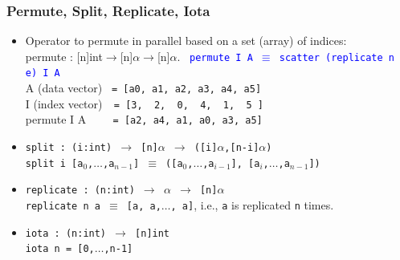 \documentclass{beamer}
\newcommand{\blue}[1]{\textcolor{Blue}{{#1}}}
\renewcommand{\emph}[1]{\textcolor{structure}{#1}}
\newcommand{\emp}[1]{\textcolor{DikuRed}{ #1}}
\begin{document}
\begin{frame}[fragile,t]
  \frametitle{Permute, Split, Replicate, Iota}

\begin{itemize}
    \item Operator to \emph{permute in parallel} based on a set (array) of indices:\\
          \emph{permute : [n]int$\rightarrow$[n]$\alpha$$\rightarrow$[n]$\alpha$}. 
          {\small~\blue{\tt permute~I~A~$\equiv$~scatter~(replicate n e)~I~A}}\\
           A (data vector) {\tt~= [a0,~a1,~a2,~a3,~a4,~a5]}\\
           I (index vector){\tt~~= [3,~~2,~~0,~~4,~~1,~~5~]}\\
           \emp{permute I A     {\tt~~~~= [a2,~a4,~a1,~a0,~a3,~a5]}}\\\bigskip
           
    \item %
          \emph{\tt split : (i:int) $\rightarrow$ [n]$\alpha$ $\rightarrow$ ([i]$\alpha$,[n-i]$\alpha$)}\\
          \emp{\tt split i [a$_0$,$\ldots$,a$_{n-1}$] $\equiv$ ([a$_0$,$\ldots$,a$_{i-1}$], [a$_i$,$\ldots$,a$_{n-1}$])}\smallskip

    \item \emph{\tt replicate : (n:int) $\rightarrow$ $\alpha$ $\rightarrow$ [n]$\alpha$}\\
            \emp{\tt replicate n a $\equiv$ [a, a,$\ldots$, a]}, i.e., {\tt a} is replicated {\tt n} times.\smallskip

    \item \emph{\tt iota : (n:int) $\rightarrow$ [n]int}\\
             \emp{\tt iota n = [0,$\ldots$,n-1]}
\end  {itemize}

\end{frame}
\end{document}
